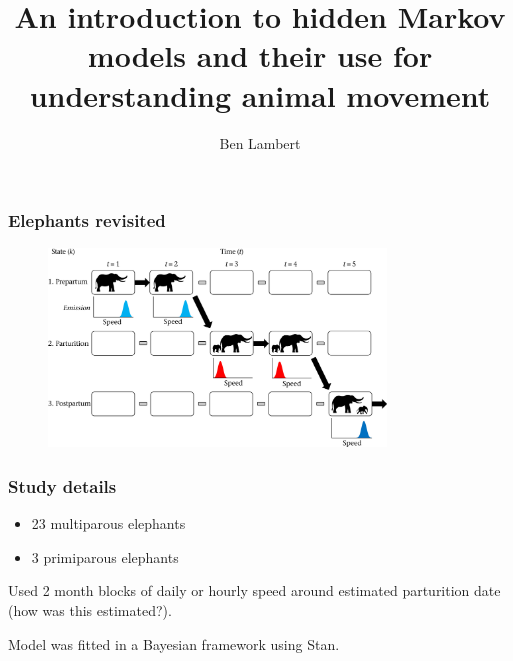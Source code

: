 \documentclass{beamer}
\title[] %
{An introduction to hidden Markov models and their use for understanding animal movement}
\date{}
\author[Lambert] %
{Ben Lambert}
\begin{document}
\frame{\titlepage}







\begin{frame}
\frametitle{Elephants revisited}

\begin{figure}
    \centering
    \includegraphics[width=0.8\textwidth]{figures/elephant_parturition.jpg}
\end{figure}
    
\end{frame}

\begin{frame}
\frametitle{Study details}

\begin{itemize}
    \item 23 multiparous elephants
    \item 3 primiparous elephants
\end{itemize}

Used 2 month blocks of daily or hourly speed around estimated parturition date (how was this estimated?).

\vspace{0.5cm}

Model was fitted in a Bayesian framework using Stan.
    
\end{frame}
\end{document}
